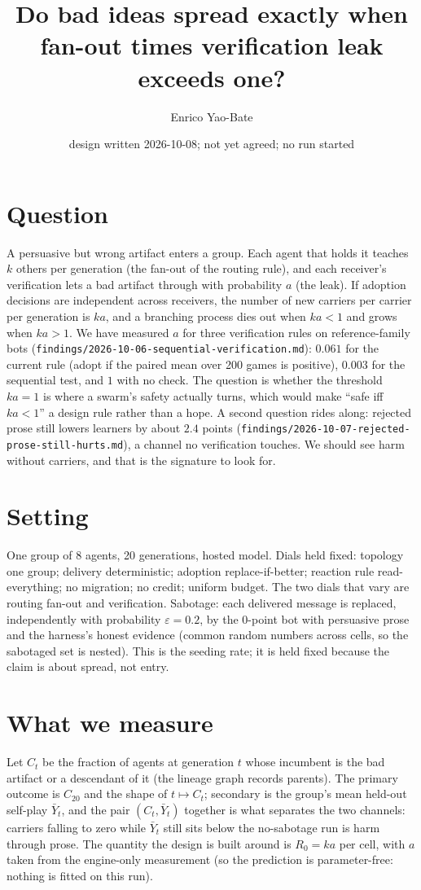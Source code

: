 \documentclass[11pt]{article}
\title{Do bad ideas spread exactly when fan-out times verification leak exceeds one?}
\author{Enrico Yao-Bate}
\date{design written 2026-10-08; not yet agreed; no run started}
\begin{document}
\maketitle

\section{Question}
A persuasive but wrong artifact enters a group. Each agent that holds it teaches $k$ others per generation
(the fan-out of the routing rule), and each receiver's verification lets a bad artifact through with
probability $a$ (the leak). If adoption decisions are independent across receivers, the number of new carriers
per carrier per generation is $k a$, and a branching process dies out when $k a<1$ and grows when $k a>1$.
We have measured $a$ for three verification rules on reference-family bots
(\texttt{findings/2026-10-06-sequential-verification.md}): $0.061$ for the current rule (adopt if the paired
mean over 200 games is positive), $0.003$ for the sequential test, and $1$ with no check. The question is
whether the threshold $k a = 1$ is where a swarm's safety actually turns, which would make ``safe iff
$k a<1$'' a design rule rather than a hope. A second question rides along: rejected prose still lowers learners
by about $2.4$ points (\texttt{findings/2026-10-07-rejected-prose-still-hurts.md}), a channel no verification
touches. We should see harm without carriers, and that is the signature to look for.

\section{Setting}
One group of 8 agents, 20 generations, hosted model. Dials held fixed: topology one group; delivery
deterministic; adoption replace-if-better; reaction rule read-everything; no migration; no credit; uniform
budget. The two dials that vary are routing fan-out and verification. Sabotage: each delivered message is
replaced, independently with probability $\varepsilon=0.2$, by the 0-point bot with persuasive prose and the
harness's honest evidence (common random numbers across cells, so the sabotaged set is nested). This is the
seeding rate; it is held fixed because the claim is about spread, not entry.

\section{What we measure}
Let $C_t$ be the fraction of agents at generation $t$ whose incumbent is the bad artifact or a descendant of it
(the lineage graph records parents). The primary outcome is $C_{20}$ and the shape of $t\mapsto C_t$;
secondary is the group's mean held-out self-play $\bar Y_t$, and the pair $(C_t,\bar Y_t)$ together is what
separates the two channels: carriers falling to zero while $\bar Y_t$ still sits below the no-sabotage run is
harm through prose. The quantity the design is built around is $R_0 = k a$ per cell, with $a$ taken from the
engine-only measurement (so the prediction is parameter-free: nothing is fitted on this run).
\end{document}
